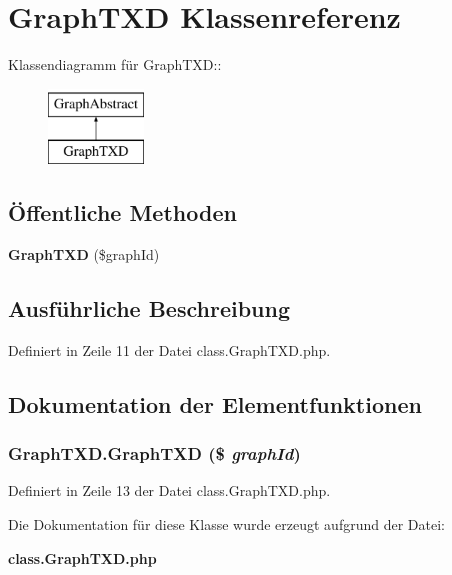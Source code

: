 \section{GraphTXD Klassenreferenz}
\label{classGraphTXD}
Klassendiagramm für GraphTXD::\begin{figure}[H]
\begin{center}
\leavevmode
\includegraphics[height=2cm]{classGraphTXD}
\end{center}
\end{figure}
\subsection*{Öffentliche Methoden}
\begin{CompactItemize}
\item 
{\bf GraphTXD} (\$graphId)
\end{CompactItemize}


\subsection{Ausführliche Beschreibung}


Definiert in Zeile 11 der Datei class.GraphTXD.php.

\subsection{Dokumentation der Elementfunktionen}
\subsubsection{\setlength{\rightskip}{0pt plus 5cm}GraphTXD.GraphTXD (\$ {\em graphId})}\label{classGraphTXD_9053944ecf9df3dd4608e5913706e916}




Definiert in Zeile 13 der Datei class.GraphTXD.php.

Die Dokumentation für diese Klasse wurde erzeugt aufgrund der Datei:\begin{CompactItemize}
\item 
{\bf class.GraphTXD.php}\end{CompactItemize}
